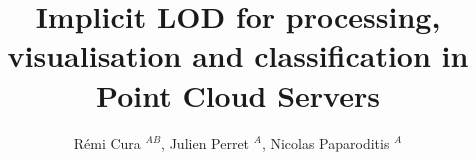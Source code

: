 
	
 
\title{ Implicit LOD for processing, visualisation and classification in Point Cloud Servers} 
\author{Rémi Cura  $^{AB}$, Julien Perret $^A$, Nicolas Paparoditis  $^A$}
\address{ $^A$  Universite Paris-Est, IGN, SRIG, COGIT \& MATIS, 73 avenue de Paris, 94160 Saint Mande, France\\
	first\_name.last\_name@ign.fr
	\\$^B$  Thales Training \& Simulation SAS, 1 rue du Général de Gaulle 95523 Cergy-Pontoise, France}






\maketitle 
	

